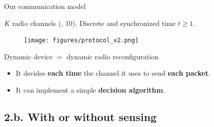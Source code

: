 \documentclass[12pt,english,ignorenonframetext,aspectratio=169,]{beamer}
\providecommand{\tightlist}{%
  \setlength{\itemsep}{0pt}\setlength{\parskip}{0pt}}
\begin{document}
\begin{frame}{Our communication model}

\(K\) radio channels (\eg, 10).
Discrete and synchronized time \(t\geq1\).

\begin{figure}[h!]
\centering
\texttt{[image: figures/protocol\_v2.png]}
\end{figure}

\begin{block}{Dynamic device \(=\) dynamic radio reconfiguration}

\begin{itemize}\tightlist
\item
  It decides \textbf{each time} the channel it uses to send \textbf{each
  packet}.
\item
  It can implement a simple \textbf{decision algorithm}.
\end{itemize}

\end{block}

\end{frame}



\subsection{\hfill{}2.b. With or without sensing\hfill{}}
\end{document}
